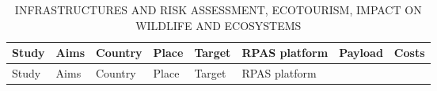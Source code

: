 \documentclass[]{interact}
\theoremstyle{plain}%
\theoremstyle{definition}
\theoremstyle{remark}
\begin{document}
\begin{longtable}[]{@{}llllllll@{}}
\caption{INFRASTRUCTURES AND RISK ASSESSMENT, ECOTOURISM, IMPACT ON
WILDLIFE AND ECOSYSTEMS}\tabularnewline
\toprule
\begin{minipage}[b]{0.11\columnwidth}\raggedright\strut
Study\strut
\end{minipage} & \begin{minipage}[b]{0.18\columnwidth}\raggedright\strut
Aims\strut
\end{minipage} & \begin{minipage}[b]{0.03\columnwidth}\raggedright\strut
Country\strut
\end{minipage} & \begin{minipage}[b]{0.14\columnwidth}\raggedright\strut
Place\strut
\end{minipage} & \begin{minipage}[b]{0.10\columnwidth}\raggedright\strut
Target\strut
\end{minipage} & \begin{minipage}[b]{0.09\columnwidth}\raggedright\strut
RPAS platform\strut
\end{minipage} & \begin{minipage}[b]{0.11\columnwidth}\raggedright\strut
Payload\strut
\end{minipage} & \begin{minipage}[b]{0.01\columnwidth}\raggedright\strut
Costs\strut
\end{minipage}\tabularnewline
\midrule
\endfirsthead
\toprule
\begin{minipage}[b]{0.11\columnwidth}\raggedright\strut
Study\strut
\end{minipage} & \begin{minipage}[b]{0.18\columnwidth}\raggedright\strut
Aims\strut
\end{minipage} & \begin{minipage}[b]{0.03\columnwidth}\raggedright\strut
Country\strut
\end{minipage} & \begin{minipage}[b]{0.14\columnwidth}\raggedright\strut
Place\strut
\end{minipage} & \begin{minipage}[b]{0.10\columnwidth}\raggedright\strut
Target\strut
\end{minipage} & \begin{minipage}[b]{0.09\columnwidth}\raggedright\strut
RPAS platform\strut
\end{minipage} & \begin{minipage}[b]{0.11\columnwidth}\raggedright\strut

\end{minipage}
\end{longtable}
\end{document}
